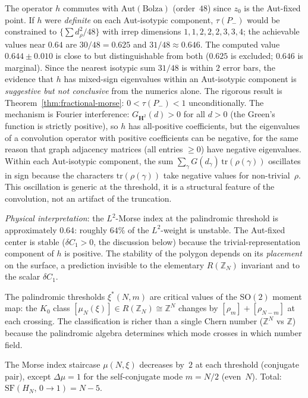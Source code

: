 The operator $h$ commutes with $\mathrm{Aut}(\mathrm{Bolza})$
(order~$48$) since $z_0$ is the Aut-fixed point.
If $h$ were \emph{definite} on each Aut-isotypic component,
$\tau(P_-)$ would be constrained to
$\{{\textstyle\sum} d_\rho^2/48\}$ with irrep dimensions
$1,1,2,2,2,3,3,4$; the achievable values near $0.64$
are $30/48 = 0.625$ and $31/48 \approx 0.646$.
The computed value $0.644 \pm 0.010$ is close to but
distinguishable from both ($0.625$ is excluded;
$0.646$ is marginal).
Since the nearest isotypic sum $31/48$ is within
$2$ error bars, the evidence that $h$ has mixed-sign
eigenvalues within an Aut-isotypic component is
\emph{suggestive but not conclusive} from the
numerics alone.
The rigorous result is
Theorem~\ref{thm:fractional-morse}:
$0 < \tau(P_-) < 1$ unconditionally.
The mechanism is Fourier interference:
$G_{\mathbf{H}^2}(d) > 0$ for all $d > 0$ (the
Green's function is strictly positive), so $h$ has
all-positive coefficients, but the eigenvalues of
a convolution operator with positive coefficients can
be negative, for the same reason that graph adjacency
matrices (all entries $\ge 0$) have negative eigenvalues.
Within each Aut-isotypic component, the sum
$\sum_\gamma G(d_\gamma)\,\mathrm{tr}(\rho(\gamma))$
oscillates in sign because the characters
$\mathrm{tr}(\rho(\gamma))$ take negative values for
non-trivial~$\rho$.
This oscillation is generic at the threshold, it is a
structural feature of the convolution, not an artifact
of the truncation.

\emph{Physical interpretation}: the $L^2$-Morse index
at the palindromic threshold is approximately $0.64$:
roughly $64\%$ of the $L^2$-weight is unstable.
The Aut-fixed center is stable ($\delta C_1 > 0$,
the discussion below) because the
trivial-representation component of $h$ is positive.
The stability of the polygon depends on its
\emph{placement} on the surface, a prediction
invisible to the elementary $R(\mathbb{Z}_N)$ invariant
and to the scalar $\delta C_1$.

\begin{remark}
\label{rem:topological-phases}
The palindromic thresholds $\xi^*(N,m)$ are critical values
of the SO$(2)$ moment map: the $K_0$ class
$[\mu_N(\xi)] \in R(\mathbb{Z}_N) \cong \mathbb{Z}^N$
changes by $[\rho_m] + [\rho_{N-m}]$ at each crossing.
The classification is richer than a single Chern number
($\mathbb{Z}^N$ vs $\mathbb{Z}$) because the palindromic
algebra determines which mode crosses in which number field.

The Morse index staircase $\mu(N,\xi)$ decreases by~$2$
at each threshold (conjugate pair), except $\Delta\mu = 1$
for the self-conjugate mode $m = N/2$ (even~$N$).
Total: $\mathrm{SF}(H_N,\, 0 \to 1) = N{-}5$.
\end{remark}

